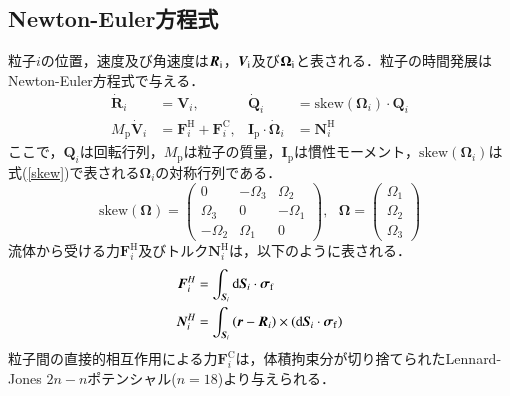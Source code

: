 \documentclass[11pt,a4j]{jarticle}
\begin{document}
\subsection{Newton-Euler方程式}
\par 粒子$i$の位置，速度及び角速度は$\boldsymbol{R}_{\rm{i}}$，$\boldsymbol{V}_{\rm{i}}$及び$\boldsymbol{\Omega}_{\rm{i}}$と表される．粒子の時間発展はNewton-Euler方程式で与える．
\begin{align}
   \dot{\boldsymbol{R}}_i &= \boldsymbol{V}_i , & \dot{\boldsymbol{Q}}_i &= \text{skew}(\boldsymbol{\Omega}_i)\cdot \boldsymbol{Q}_i
      \\
   M_{\text{p}}\dot{\boldsymbol{V}}_i &= \boldsymbol{F}_i^{\text{H}}+\boldsymbol{F}_i^{\text{C}} , & \boldsymbol{I}_{\text{p}}\cdot\dot{\boldsymbol{\Omega}}_i &= \boldsymbol{N}_i^{\text{H}}
\end{align}
\label{Newton_Euler}
\noindent
ここで，$\boldsymbol{Q}_i$は回転行列，$M_{\text{p}}$は粒子の質量，$\boldsymbol{I}_{\text{p}}$は慣性モーメント，$ \text{skew}(\boldsymbol{\Omega}_i)$は式(\ref{skew})で表される$\boldsymbol{\Omega}_i$の対称行列である．
\begin{equation}
　　\text{skew}(\boldsymbol{\Omega}) =
       \begin{pmatrix}
          0&-\Omega_3&\Omega_2\\
          \Omega_3&0&-\Omega_1\\
          -\Omega_2&\Omega_1&0
       \end{pmatrix},\ \ \
       \boldsymbol{\Omega}=
       \begin{pmatrix}
          \Omega_1\\
          \Omega_2\\
          \Omega_3
       \end{pmatrix}
       \label{skew}
 \end{equation}
流体から受ける力$\boldsymbol{F}_i^{\text{H}}$及びトルク$\boldsymbol{N}_i^{\text{H}}$は，以下のように表される．
\begin{align}
   \boldsymbol{F}_i^H&=\int_{\boldsymbol{S}_i}\text{d}\boldsymbol{S}_i\cdot \boldsymbol{\sigma}_{\rm{f}}\\
   \boldsymbol{N}_i^H&= \int_{\boldsymbol{S}_i}\left( \boldsymbol{r}-\boldsymbol{R}_i \right) \times\left(\text{d}\boldsymbol{S}_i\cdot\boldsymbol{\sigma}_{\rm{f}}\right)
\end{align}
\label{FandN}
粒子間の直接的相互作用による力$\boldsymbol{F}_i^{\text{C}}$は，体積拘束分が切り捨てられたLennard-Jones $2n-n$ポテンシャル($n = 18$)より与えられる．
\end{document}
